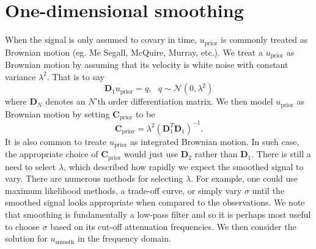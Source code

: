 \documentclass[10pt,a4paper]{article}
\begin{document}
\section*{One-dimensional smoothing}
When the signal is only assumed to covary in time, $u_\mathrm{prior}$ is commonly treated as Brownian motion (eg. Me Segall, McQuire, Murray, etc.).  We treat a $u_\mathrm{prior}$ as Brownian motion by assuming that its velocity is white noise with constant variance $\lambda^2$. That is to say
\begin{equation}
  \mathbf{D}_1 u_\mathrm{prior} = q, \ \ \ q \sim \mathcal{N}(0,\lambda^2)
\end{equation}     
where $\mathbf{D}_N$ denotes an $N$'th order differentiation matrix.  We then model $u_\mathrm{prior}$ as Brownian motion by setting $\mathbf{C}_\mathrm{prior}$ to be
\begin{equation}
\mathbf{C_\mathrm{prior}} = \lambda^2(\mathbf{D}_1^T\mathbf{D}_1)^{-1}.
\end{equation}
It is also common to treate $u_\mathrm{prior}$ as integrated Brownian motion. In such case, the appropriate choice of $\mathbf{C}_\mathrm{prior}$ would just use $\mathbf{D}_2$ rather than $\mathbf{D}_1$.  There is still a need to select $\lambda$, which described how rapidly we expect the smoothed signal to vary.  There are numerous methods for selecting $\lambda$.  For example, one could use maximum likelihood methods, a trade-off curve, or simply vary $\sigma$ until the smoothed signal looks appropriate when compared to the observations.  We note that smoothing is fundamentally a low-pass filter and so it is perhaps most useful to choose $\sigma$ based on its cut-off attenuation frequencies.  We then consider the solution for $u_\mathrm{smooth}$ in the frequency domain.  
\end{document}
